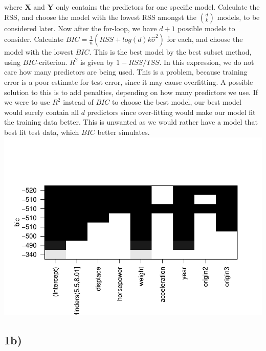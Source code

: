 \documentclass[]{article}
\begin{document}
\begin{itemize}
  where \(\boldsymbol{X}\) and \(\boldsymbol{Y}\) only contains the
  predictors for one specific model. Calculate the RSS, and choose the
  model with the lowest RSS amongst the \(\binom{d}{k}\) models, to be
  considered later. Now after the for-loop, we have \(d+1\) possible
  models to consider. Calculate
  \(BIC=\frac{1}{n}(RSS+log(d)k\hat \sigma^2)\) for each, and choose the
  model with the lowest \(BIC\). This is the best model by the best
  subset method, using \(BIC\)-criterion. \(R^2\) is given by
  \(1-RSS/TSS\). In this expression, we do not care how many predictors
  are being used. This is a problem, because training error is a poor
  estimate for test error, since it may cause overfitting. A possible
  solution to this is to add penalties, depending on how many predictors
  we use. If we were to use \(R^2\) instead of \(BIC\) to choose the
  best model, our best model would surely contain all \(d\) predictors
  since over-fitting would make our model fit the training data better.
  This is unwanted as we would rather have a model that best fit test
  data, which \(BIC\) better simulates.
  \includegraphics{1_files/figure-latex/unnamed-chunk-1-1.pdf}
\end{itemize}

\subsection{1b)}\label{b}
\end{document}
